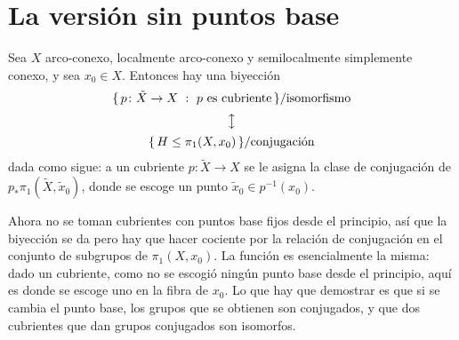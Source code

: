 \documentclass[11pt]{article}
\begin{document}
\section*{La versión sin puntos base}

\begin{teo}\label{teo:clasificacion-conjugacion}
Sea $X$ arco-conexo, localmente arco-conexo y semilocalmente simplemente conexo, y sea $x_0\in X$. Entonces hay una biyección
\[
  \begin{gathered}\{\,p\colon\tilde X\to X\ :\ p\text{ es cubriente}\,\}/\text{isomorfismo}\\[2pt] \big\updownarrow\\[2pt] \{\,H\le\pi_1(X,x_0)\,\}/\text{conjugación}\end{gathered}
\]
dada como sigue: a un cubriente $p\colon\tilde X\to X$ se le asigna la clase de conjugación de $p_*\pi_1(\tilde X,\tilde x_0)$, donde se escoge un punto $\tilde x_0\in p^{-1}(x_0)$.
\end{teo}

Ahora no se toman cubrientes con puntos base fijos desde el principio, así que la biyección se da pero hay que hacer cociente por la relación de conjugación en el conjunto de subgrupos de $\pi_1(X,x_0)$. La función es esencialmente la misma: dado un cubriente, como no se escogió ningún punto base desde el principio, aquí es donde se escoge uno en la fibra de $x_0$. Lo que hay que demostrar es que si se cambia el punto base, los grupos que se obtienen son conjugados, y que dos cubrientes que dan grupos conjugados son isomorfos.
\end{document}
